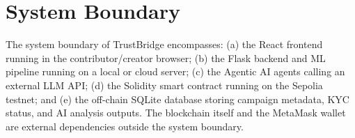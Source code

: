 \section{System Boundary}

The system boundary of TrustBridge encompasses: (a) the React frontend running in the contributor/creator browser; (b) the Flask backend and ML pipeline running on a local or cloud server; (c) the Agentic AI agents calling an external LLM API; (d) the Solidity smart contract running on the Sepolia testnet; and (e) the off-chain SQLite database storing campaign metadata, KYC status, and AI analysis outputs. The blockchain itself and the MetaMask wallet are external dependencies outside the system boundary.
